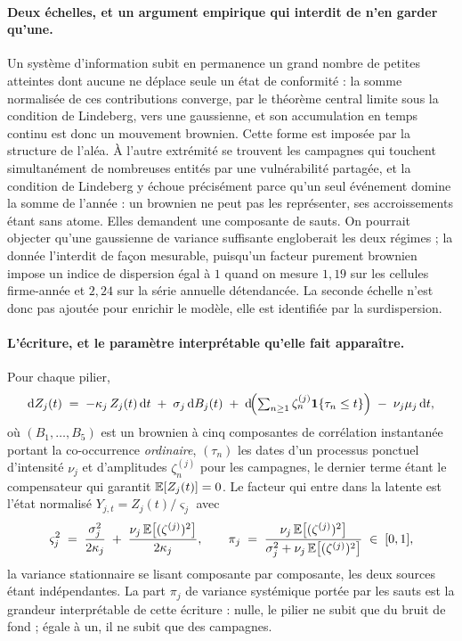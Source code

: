 \paragraph{Deux échelles, et un argument empirique qui interdit de n'en garder qu'une.}
Un système d'information subit en permanence un grand nombre de petites atteintes dont aucune
ne déplace seule un état de conformité : la somme normalisée de ces contributions converge, par
le théorème central limite sous la condition de Lindeberg, vers une gaussienne, et son
accumulation en temps continu est donc un mouvement brownien. Cette forme est imposée par la
structure de l'aléa. À l'autre extrémité se trouvent
les campagnes qui touchent simultanément de nombreuses entités par une vulnérabilité partagée,
et la condition de Lindeberg y échoue précisément parce qu'un seul événement domine la
somme de l'année : un brownien ne peut pas les représenter, ses accroissements étant sans
atome. Elles demandent une composante de sauts. On pourrait objecter qu'une gaussienne
de variance suffisante engloberait les deux régimes ; la donnée l'interdit de façon mesurable,
puisqu'un facteur purement brownien impose un indice de dispersion égal à $1$ quand on mesure
$1{,}19$ sur les cellules firme-année et $2{,}24$ sur la série annuelle
détendancée. La seconde
échelle n'est donc pas ajoutée pour enrichir le modèle, elle est identifiée par la
surdispersion.

\paragraph{L'écriture, et le paramètre interprétable qu'elle fait apparaître.}
Pour chaque pilier,
\begin{equation}
  \mathrm{d}Z_j(t) \;=\; -\kappa_j\,Z_j(t)\,\mathrm{d}t \;+\; \sigma_j\,\mathrm{d}B_j(t)
  \;+\; \mathrm{d}\!\Bigl(\textstyle\sum_{n\ge 1}\zeta^{(j)}_n\mathbf 1\{\tau_n\le t\}\Bigr)
  \;-\; \nu_j\mu_j\,\mathrm{d}t,
  \label{eq:sde-Y}
\end{equation}
où $(B_1,\dots,B_5)$ est un brownien à cinq composantes de corrélation instantanée portant la
co-occurrence \emph{ordinaire}, $(\tau_n)$ les dates d'un processus ponctuel d'intensité $\nu_j$
et d'amplitudes $\zeta^{(j)}_n$ pour les campagnes, le dernier terme étant le compensateur qui
garantit $\mathbb{E}[Z_j(t)]=0$. Le facteur qui entre dans la latente est l'état normalisé
$Y_{j,t}=Z_j(t)/\varsigma_j$ avec
\begin{equation}
  \varsigma_j^2 \;=\; \frac{\sigma_j^2}{2\kappa_j} \;+\;
  \frac{\nu_j\,\mathbb{E}\bigl[(\zeta^{(j)})^2\bigr]}{2\kappa_j},
  \qquad
  \pi_j \;=\; \frac{\nu_j\,\mathbb{E}\bigl[(\zeta^{(j)})^2\bigr]}
                   {\sigma_j^2+\nu_j\,\mathbb{E}\bigl[(\zeta^{(j)})^2\bigr]} \;\in\; [0,1],
  \label{eq:norm-Y}
\end{equation}
la variance stationnaire se lisant composante par composante, les deux sources étant
indépendantes. La part $\pi_j$ de variance systémique portée par les sauts est la grandeur
interprétable de cette écriture : nulle, le pilier ne subit que du bruit de fond ; égale à un,
il ne subit que des campagnes.

